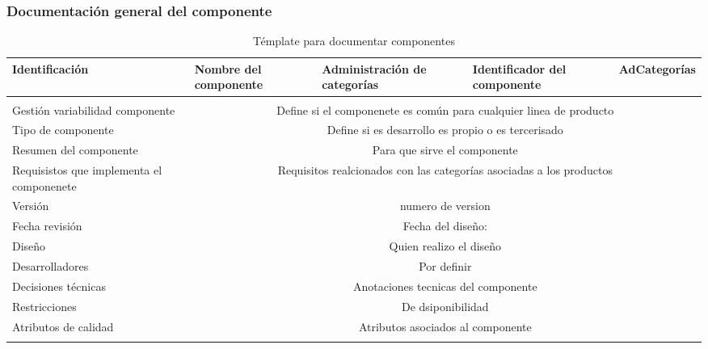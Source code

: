 \documentclass[10pt,a4paper,openany]{book}
\begin{document}
\subsubsection{Documentación general del componente }

\begin{longtable}{|p{3cm}|p{3cm}|p{3cm}|p{3cm}|p{3cm}|} \hline
Identificación & Nombre del componente & Administración de categorías & Identificador del componente & AdCategorías \\[0.5ex] \hline
& & & & \\[0.5ex] \hline
Gestión variabilidad componente & \multicolumn{4}{|c|}{Define si el componenete es común para cualquier linea de producto} \\ \hline
Tipo de componente & \multicolumn{4}{|c|}{Define si es desarrollo es propio o es tercerisado} \\ \hline
Resumen del componente & \multicolumn{4}{|c|}{Para que sirve el componente} \\ \hline
Requisistos que implementa el componenete & \multicolumn{4}{|c|}{Requisitos realcionados con las categorías asociadas a los productos } \\ \hline
Versión & \multicolumn{4}{|c|}{ numero de version } \\ \hline
Fecha revisión & \multicolumn{4}{|c|}{ Fecha del diseño:} \\ \hline
Diseño & \multicolumn{4}{|c|}{Quien realizo el diseño} \\ \hline
Desarrolladores & \multicolumn{4}{|c|}{Por definir} \\ \hline
Decisiones técnicas & \multicolumn{4}{|c|}{Anotaciones tecnicas del componente} \\ \hline
Restricciones & \multicolumn{4}{|c|}{De dsiponibilidad} \\ \hline
Atributos de calidad & \multicolumn{4}{|c|}{Atributos asociados al componente} \\ \hline
\caption{Témplate para documentar componentes}
\label{table:t6}
\end{longtable}




\medskip


\end{document}

